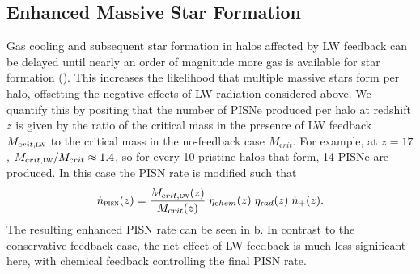 \documentclass[../thesis.tex]{subfiles}
\begin{document}
\subsection{Enhanced Massive Star Formation}
Gas cooling and subsequent star formation in halos affected by LW
feedback can be delayed until nearly an order of magnitude more gas is
available for star formation (). This increases the
likelihood that multiple massive stars form per halo, offsetting the
negative effects of LW radiation considered above.  We quantify this
by positing that the number of PISNe produced per halo at redshift $z$
is given by the ratio of the critical mass in the presence of LW
feedback $M_{\mathrm crit, \textsc{lw}}$ to the critical mass in the
no-feedback case $M_{\mathrm crit}$.  For example, at $z=17$, $M_{\mathrm
  crit, \textsc{lw}} / M_{\mathrm crit} \approx 1.4$, so for every 10
pristine halos that form, 14 PISNe are produced.  In this case the
PISN rate is modified such that
\begin{equation}
\dot{n}_{\textsc{pisn}}(z) = \frac{M_{\mathrm crit, \textsc{lw}}(z)}{M_{\mathrm crit}(z)} \;
\eta_{\mathrm chem}(z) \; \eta_{\mathrm rad}(z) \; \dot{n}_{+}(z).
\label{pisnrate2}
\end{equation}
The resulting enhanced PISN rate can be seen in b.  In
contrast to the conservative feedback case, the net effect of LW
feedback is much less significant here, with chemical feedback
controlling the final PISN rate.
\end{document}
